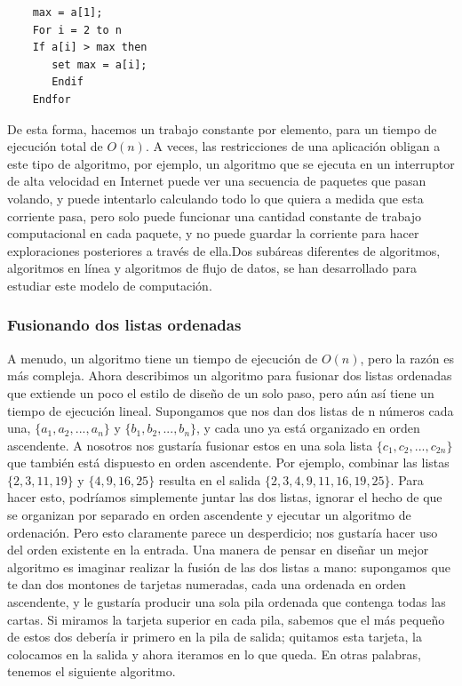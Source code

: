 \documentclass[a4paper, 12pt]{book}
\theoremstyle{dotless}
\begin{document}
\begin{lstlisting}
	max = a[1];
	For i = 2 to n
	If a[i] > max then
	   set max = a[i];
	   Endif
	Endfor
\end{lstlisting}

De esta forma, hacemos un trabajo constante por elemento, para un tiempo de ejecución total de $O(n)$. A veces, las restricciones de una aplicación obligan a este tipo de algoritmo, por ejemplo, un algoritmo que se ejecuta en un interruptor de alta velocidad en Internet puede ver una secuencia de paquetes que pasan volando, y puede intentarlo calculando todo lo que quiera a medida que esta corriente pasa, pero solo puede funcionar una cantidad constante de trabajo computacional en cada paquete, y no puede guardar la corriente para hacer exploraciones posteriores a través de ella.Dos subáreas diferentes de algoritmos, algoritmos en línea y algoritmos de flujo de datos, se han desarrollado para estudiar este modelo de computación.\\

\subsubsection*{Fusionando dos listas ordenadas}

A menudo, un algoritmo tiene un tiempo de ejecución de $O(n)$, pero la razón es más compleja. Ahora describimos un algoritmo para fusionar dos listas ordenadas que extiende un poco el estilo de diseño de un solo paso, pero aún así tiene un tiempo de ejecución lineal. Supongamos que nos dan dos listas de n números cada una, $ \{a_1, a_2,. . . , a_n\}$ y $\{b_1, b_2,. . . , b_n\}$, y cada uno ya está organizado en orden ascendente. A nosotros nos gustaría fusionar estos en una sola lista $\{c_1, c_2,. . . , c_{2n}\}$ que también está dispuesto en orden ascendente. Por ejemplo, combinar las listas $\{2, 3, 11, 19\}$ y $\{4, 9, 16, 25\}$ resulta en el salida $\{2, 3, 4, 9, 11, 16, 19, 25\}$. Para hacer esto, podríamos simplemente juntar las dos listas, ignorar el hecho de que se organizan por separado en orden ascendente y ejecutar un algoritmo de ordenación. Pero esto claramente parece un desperdicio; nos gustaría hacer uso del orden existente en la entrada. Una manera de pensar en diseñar un mejor algoritmo es imaginar realizar la fusión de las dos listas a mano: supongamos que te dan dos montones de tarjetas numeradas, cada una ordenada en orden ascendente, y le gustaría producir una sola pila ordenada que contenga todas las cartas. Si miramos la tarjeta superior en cada pila, sabemos que el más pequeño de estos dos debería ir primero en la pila de salida; quitamos esta tarjeta, la colocamos en la salida y ahora iteramos en lo que queda. En otras palabras, tenemos el siguiente algoritmo.\\
\end{document}
